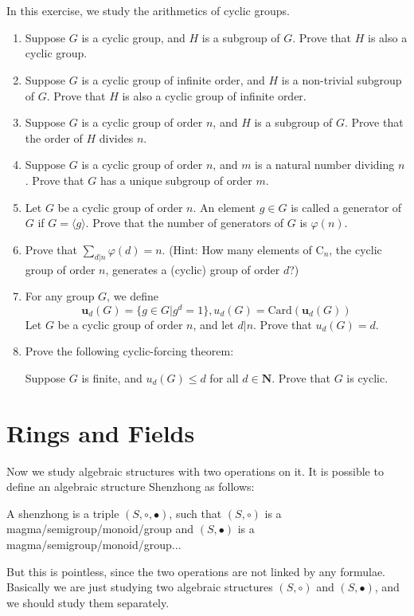 \documentclass{report}
\begin{document}
\section{}
In this exercise, we study the arithmetics of cyclic groups.
\begin{enumerate}
\item Suppose $G$ is a cyclic group, and $H$ is a subgroup of $G$. Prove that $H$ is also a cyclic group.
\item Suppose $G$ is a cyclic group of infinite order, and $H$ is a non-trivial subgroup of $G$. Prove that $H$ is also a cyclic group of infinite order.
\item Suppose $G$ is a cyclic group of order $n$, and $H$ is a subgroup of $G$. Prove that the order of $H$ divides $n$.
\item Suppose $G$ is a cyclic group of order $n$, and $m$ is a natural number dividing $n$. Prove that $G$ has a unique subgroup of order $m$.
\item Let $G$ be a cyclic group of order $n$. An element $g \in G$ is called a generator of $G$ if $G = \langle g \rangle$. Prove that the number of generators of $G$ is $\varphi(n)$.
\item Prove that $\sum_{d|n}\varphi(d) = n$. (Hint: How many elements of $\text{C}_n$, the cyclic group of order $n$, generates a (cyclic) group of order $d$?)
\item For any group $G$, we define
\[\mathbf{u}_d(G) = \{g \in G| g^d = 1\}, u_d(G) = \text{Card}(\mathbf{u}_d(G))\]
Let $G$ be a cyclic group of order $n$, and let $d|n$. Prove that $u_d(G) = d$.
\item
Prove the following cyclic-forcing theorem:

Suppose $G$ is finite, and $u_d(G) \le d$ for all $d \in \mathbf{N}$. Prove that $G$ is cyclic.
\end{enumerate}
\newpage
\section*{Rings and Fields}
Now we study algebraic structures with two operations on it. It is possible to define an algebraic structure Shenzhong as follows:

A shenzhong is a triple $(S,\circ,\bullet)$, such that $(S,\circ)$ is a magma/semigroup/monoid/group and $(S,\bullet)$ is a magma/semigroup/monoid/group...

But this is pointless, since the two operations are not linked by any formulae. Basically we are just studying two algebraic structures $(S,\circ)$ and $(S,\bullet)$, and we should study them separately.
\end{document}
